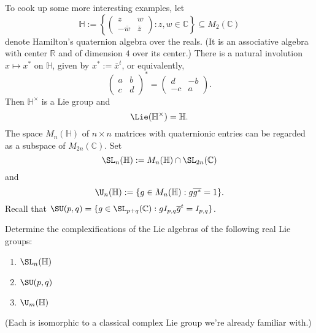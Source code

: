\documentclass[reqno]{amsart} 
\begin{document}
To cook up some more interesting examples,
let
\begin{equation*}
  \mathbb{H} :=
  \left\{ 
\begin{pmatrix}
      z & w \\
      -\overline{w} &  \overline{z}
    \end{pmatrix}
 : z,w \in \mathbb{C}  \right\}
  \subseteq M_2(\mathbb{C})
\end{equation*}
denote Hamilton's quaternion algebra over the reals.
(It is an associative algebra with center $\mathbb{R}$
and of dimension $4$ over its center.)
There is a natural involution $x \mapsto x^*$ on $\mathbb{H}$,
given by
$x^* := \overline{x}^t$,
or equivalently,
\begin{equation*}
  \begin{pmatrix}
    a & b \\
    c & d
  \end{pmatrix}
^*
  =
  \begin{pmatrix}
    d & -b \\
    -c & a
  \end{pmatrix}
.
\end{equation*}
Then
$\mathbb{H}^\times$ is a Lie group and
\begin{equation*}
  \Lie(\mathbb{H}^\times) = \mathbb{H}.
\end{equation*}
The space $M_n(\mathbb{H})$
of $n \times n$ matrices with quaternionic entries
can be regarded as a subspace of
$M_{2 n}(\mathbb{C})$.
Set
\begin{equation*}
  \SL_n(\mathbb{H}) :=
  M_n(\mathbb{H}) \cap \SL_{2n}(\mathbb{C})
\end{equation*}
and
\begin{equation*}
  \U_n(\mathbb{H})
  :=
  \{ g \in M_n(\mathbb{H}) : g \overline{g^*} = 1 \}.
\end{equation*}
Recall that $\SU(p,q) = \{g \in \SL_{p+q}(\mathbb{C}) :
g I_{p,q} \overline{g}^t = I_{p,q}
\}$.

\begin{exercise}\label{exe:complexifications}
  Determine the complexifications of
  the Lie algebras of the following real Lie groups:
  \begin{enumerate}
  \item $\SL_n(\mathbb{H})$
  \item $\SU(p,q)$
  \item $\U_m(\mathbb{H})$
  \end{enumerate}
  (Each is isomorphic to a classical complex Lie group
  we're already familiar with.)
\end{exercise}
\end{document}
